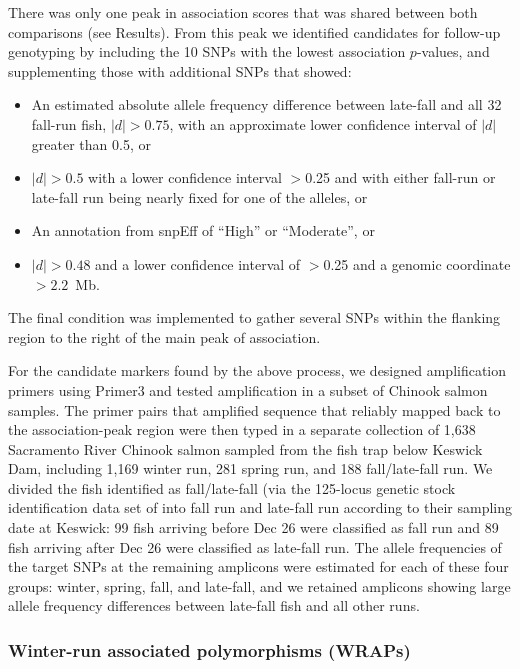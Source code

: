 There was only one peak in association scores that was shared between both comparisons (see
Results). From this peak we identified candidates for follow-up genotyping by including the 10
SNPs with the lowest association $p$-values, and supplementing those with additional SNPs that
showed:
\begin{itemize}
\item An estimated absolute allele frequency difference between late-fall and all 32 fall-run fish, $|d| >0.75$,  with an approximate lower confidence interval of $|d|$ greater than 0.5,  or
\item $|d| >0.5$ with a lower confidence interval $>$0.25 and
with either fall-run or late-fall run being nearly fixed for one of the alleles, or
\item An annotation from snpEff \citep{cingolani2012program} of “High” or “Moderate”, or
\item $|d|>0.48$ and a lower confidence interval of $>$0.25 and a
genomic  coordinate $> 2.2$~Mb.
\end{itemize}
The final condition was implemented to gather several SNPs within the flanking region to the right of
the main peak of association.

For the candidate markers found by the above process, we designed amplification primers using
Primer3 \citep{koressaar2007enhancements,untergasser2012primer3} and tested amplification in a
subset of Chinook salmon
samples. The primer pairs that amplified sequence that reliably mapped back to the association-peak region were then typed
in a separate collection of 1,638 Sacramento River Chinook salmon sampled from the fish trap below Keswick Dam, including 1,169 winter run, 281 spring
run, and 188 fall/late-fall run. We divided the fish identified as fall/late-fall (via the 125-locus genetic
stock identification data set of \citealt{thompson2020complex} into fall run and late-fall run according
to their sampling date at Keswick:  99 fish arriving before Dec 26 were classified as fall run and 89 fish arriving after Dec 26 were
classified as late-fall run.   The allele frequencies of the target SNPs at the remaining amplicons
were
estimated for each of these four groups: winter, spring, fall, and late-fall, and we retained
amplicons showing large allele frequency differences between late-fall fish and all other runs.


\subsubsection*{Winter-run associated polymorphisms (WRAPs)}

